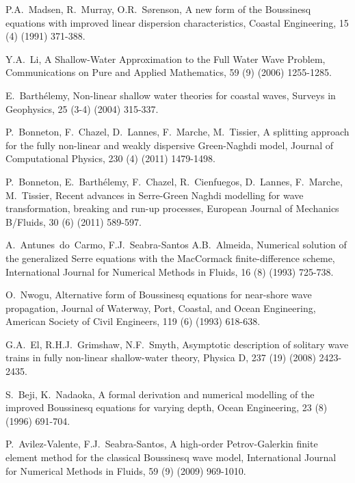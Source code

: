 \documentclass[preprint,sort&compress,1p]{article}
\begin{document}
\begin{thebibliography}{99}

 P.A.~Madsen, R.~Murray, O.R.~S{\o}renson, A new form of the Boussinesq equations with improved linear dispersion characteristics, Coastal Engineering, 15 (4) (1991) 371-388.

Y.A.~Li,  A Shallow-Water Approximation to the Full Water Wave Problem, Communications on Pure and Applied Mathematics, 59 (9) (2006) 1255-1285.

 E.~Barth\'{e}lemy, Non-linear shallow water theories for coastal waves, Surveys in Geophysics, 25 (3-4) (2004) 315-337.

 P.~Bonneton, F.~Chazel, D.~Lannes, F.~Marche, M.~Tissier, A splitting approach for the fully non-linear and weakly dispersive Green-Naghdi model, Journal of Computational Physics, 230 (4) (2011) 1479-1498.

 P.~Bonneton, E.~Barth\'{e}lemy, F.~Chazel, R.~Cienfuegos, D.~Lannes, F.~Marche, M.~Tissier, Recent advances in Serre-Green Naghdi modelling for wave transformation, breaking and run-up processes, European Journal of Mechanics B/Fluids, 30 (6) (2011) 589-597.

 A.~Antunes~do~Carmo, F.J.~Seabra-Santos A.B.~Almeida, Numerical solution of the generalized Serre equations with the MacCormack finite-difference scheme, International Journal for Numerical Methods in Fluids, 16 (8) (1993) 725-738.

 O.~Nwogu, Alternative form of Boussinesq equations for near-shore wave propagation, Journal of Waterway, Port, Coastal, and Ocean Engineering, American Society of Civil Engineers, 119 (6) (1993) 618-638.

 G.A.~El, R.H.J.~Grimshaw, N.F.~Smyth, Asymptotic description of solitary wave trains in fully non-linear shallow-water theory, Physica D, 237 (19) (2008) 2423-2435.

 S.~Beji, K.~Nadaoka, A formal derivation and numerical modelling of the improved Boussinesq equations for varying depth, Ocean Engineering, 23 (8) (1996) 691-704.

 P.~Avilez-Valente, F.J.~Seabra-Santos, A high-order Petrov-Galerkin finite element method for the classical Boussinesq wave model, International Journal for Numerical Methods in Fluids, 59 (9) (2009) 969-1010.


\end{thebibliography}
\end{document}
